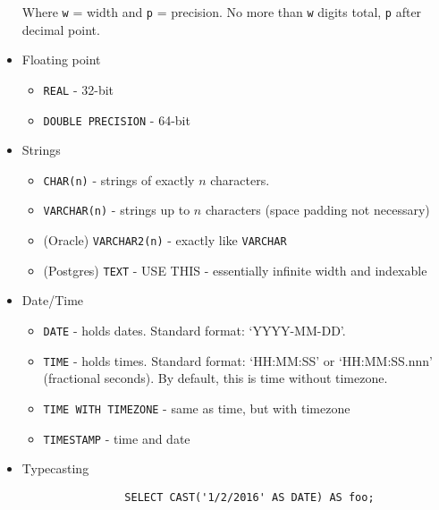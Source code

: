 \documentclass{../cheatsheet}
\begin{document}
\begin{multicols*}{2}
\begin{itemize}
            Where \texttt{w} = width and \texttt{p} = precision. No more than
            \texttt{w} digits total, \texttt{p} after decimal point.

        \item Floating point
            \begin{itemize}
                \item \texttt{REAL} - 32-bit
                \item \texttt{DOUBLE PRECISION} - 64-bit
            \end{itemize}

        \item Strings
            \begin{itemize}
                \item \texttt{CHAR(n)} - strings of exactly $n$ characters.
                \item \texttt{VARCHAR(n)} - strings up to $n$ characters (space
                    padding not necessary)
                \item (Oracle) \texttt{VARCHAR2(n)} - exactly like \texttt{VARCHAR}
                \item (Postgres) \texttt{TEXT} - USE THIS - essentially infinite
                    width and indexable
            \end{itemize}

        \item Date/Time
            \begin{itemize}
                \item \texttt{DATE} - holds dates. Standard format: `YYYY-MM-DD'.
                \item \texttt{TIME} - holds times. Standard format: `HH:MM:SS' or
                    `HH:MM:SS.nnn' (fractional seconds). By default, this is time
                    without timezone.
                \item \texttt{TIME WITH TIMEZONE} - same as time, but with timezone
                \item \texttt{TIMESTAMP} - time and date
            \end{itemize}

        \item Typecasting
            \begin{verbatim}
                SELECT CAST('1/2/2016' AS DATE) AS foo;
            \end{verbatim}

    \end{itemize}


\end{multicols*}
\end{document}
